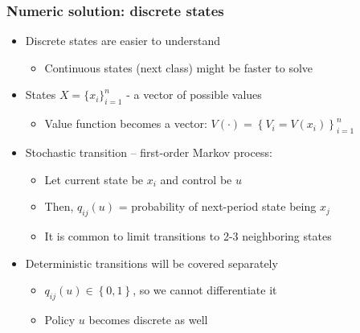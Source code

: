 \documentclass[bigger,handout]{beamer}
\begin{document}
\begin{frame}%

\frametitle{Numeric solution: discrete states}

\begin{itemize}
\item Discrete states are easier to understand

\begin{itemize}
\item Continuous states (next class) might be faster to solve
\end{itemize}

\item States $X=\{x_{i}\}_{i=1}^{n}$ - a vector of possible values

\begin{itemize}
\item Value function becomes a vector: $V\left( \cdot \right) =\left\{
V_{i}=V\left( x_{i}\right) \right\} _{i=1}^{n}$
\end{itemize}

\item Stochastic transition -- first-order Markov process:

\begin{itemize}
\item Let current state be $x_{i}$ and control be $u$

\item Then, $q_{ij}(u)$ = probability of next-period state being $x_{j}$

\item It is common to limit transitions to 2-3 neighboring states
\end{itemize}

\item Deterministic transitions will be covered separately

\begin{itemize}
\item $q_{ij}(u)\in \left\{ 0,1\right\} $, so we cannot differentiate it

\item Policy $u$ becomes discrete as well
\end{itemize}
\end{itemize}



\end{frame}%
\end{document}
